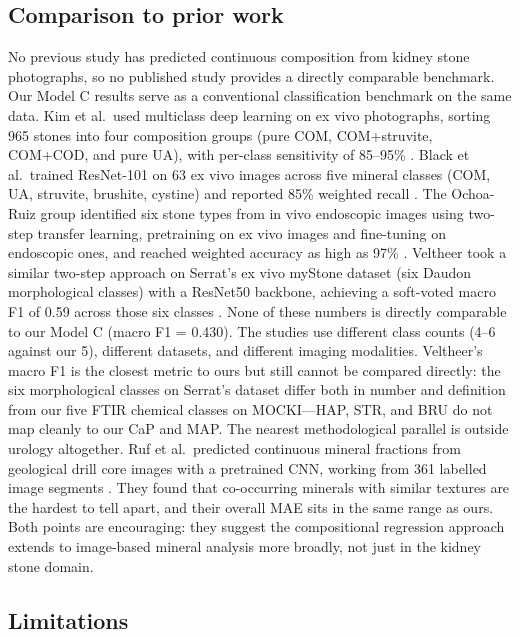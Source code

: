 \documentclass[10pt,twocolumn]{article}
\begin{document}
\subsection*{Comparison to prior work}
 
No previous study has predicted continuous composition from kidney stone photographs, so no published study provides a directly comparable benchmark. Our Model C results serve as a conventional classification benchmark on the same data.
Kim et al.\ used multiclass deep learning on ex vivo photographs, sorting 965 stones into four composition groups (pure COM, COM+struvite, COM+COD, and pure UA), with per-class sensitivity of 85--95\% \cite{Kim2022}. Black et al.\ trained ResNet-101 on 63 ex vivo images across five mineral classes (COM, UA, struvite, brushite, cystine) and reported 85\% weighted recall \cite{Black2020}. The Ochoa-Ruiz group identified six stone types from in vivo endoscopic images using two-step transfer learning, pretraining on ex vivo images and fine-tuning on endoscopic ones, and reached weighted accuracy as high as 97\% \cite{LopezTiro2021, LopezTiro2024}. Veltheer took a similar two-step approach on Serrat's ex vivo myStone dataset (six Daudon morphological classes) with a ResNet50 backbone, achieving a soft-voted macro F1 of 0.59 across those six classes \cite{veltheer2025}. None of these numbers is directly comparable to our Model C (macro F1 = 0.430). The studies use different class counts (4--6 against our 5), different datasets, and different imaging modalities. Veltheer's macro F1 is the closest metric to ours but still cannot be compared directly: the six morphological classes on Serrat's dataset differ both in number and definition from our five FTIR chemical classes on MOCKI---HAP, STR, and BRU do not map cleanly to our CaP and MAP.
The nearest methodological parallel is outside urology altogether. Ruf et al.\ predicted continuous mineral fractions from geological drill core images with a pretrained CNN, working from 361 labelled image segments \cite{Ruf2024}. They found that co-occurring minerals with similar textures are the hardest to tell apart, and their overall MAE sits in the same range as ours. Both points are encouraging: they suggest the compositional regression approach extends to image-based mineral analysis more broadly, not just in the kidney stone domain.
 
\subsection*{Limitations}
 
\end{document}
